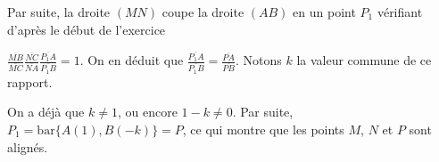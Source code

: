 {{Par suite, la droite $(MN)$ coupe la droite $(AB)$ en un point $P_1$ vérifiant d'après le début de l'exercice

$\frac{\overline{MB}}{\overline{MC}}\frac{\overline{NC}}{\overline{NA}}\frac{\overline{P_1A}}{\overline{P_1B}}=1$. On en déduit que $\frac{\overline{P_1A}}{\overline{P_1B}}=\frac{\overline{PA}}{\overline{PB}}$. Notons $k$ la valeur commune de ce rapport.

On a déjà que $k\neq1$, ou encore $1-k\neq0$. Par suite, $P_1=\mbox{bar}\{A(1),B(-k)\}=P$, ce qui montre que les points $M$, $N$ et $P$ sont alignés.}
}